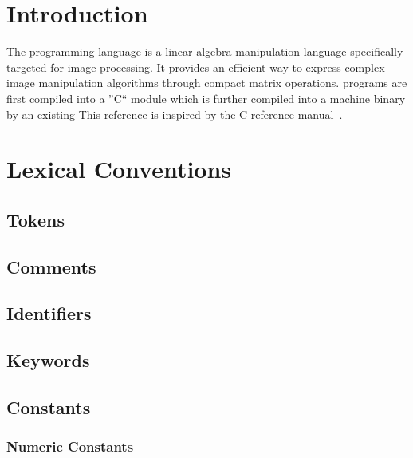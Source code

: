 \newcommand{\startsyn}{\begin{center}\begin{tabular}{l}}
\newcommand{\stopsyn}{\end{tabular}\end{center}}

\section{Introduction}
The \sys{} programming language is a linear algebra manipulation language
specifically targeted for image processing. It provides an efficient way to
express complex image manipulation algorithms through compact matrix
operations. \sys{} programs are first compiled into a ''C`` module which is
further compiled into a machine binary by an existing 
This reference is inspired by the C reference manual~\cite{DBLP:books/ph/KernighanR88}.

\section{Lexical Conventions}
\label{sec:lex}

\subsection{Tokens}
\label{ssec:tokens}

\subsection{Comments}
\label{ssec:comments}

\subsection{Identifiers}
\label{ssec:identifiers}

\subsection{Keywords}
\label{ssec:keywords}

\subsection{Constants}
\label{ssec:constants}

\subsubsection{Numeric Constants}
\label{sssec:numericconstants}

